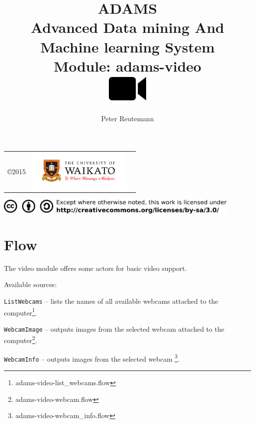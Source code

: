 \documentclass[a4paper]{book}
\title{
  \textbf{ADAMS} \\
  {\Large \textbf{A}dvanced \textbf{D}ata mining \textbf{A}nd \textbf{M}achine
  learning \textbf{S}ystem} \\
  {\Large Module: adams-video} \\
  \vspace{1cm}
  \includegraphics[width=2cm]{images/video-module.png} \\
}
\author{
  Peter Reutemann
}
\begin{document}
\begin{titlepage}
\maketitle

\thispagestyle{empty}
\center
\begin{table}[b]
	\begin{tabular}{c l l}
		\parbox[c][2cm]{2cm}{\copyright 2015} &
		\parbox[c][2cm]{5cm}{\includegraphics[width=5cm]{images/coat_of_arms.pdf}} \\
	\end{tabular}
	\includegraphics[width=12cm]{images/cc.png} \\
\end{table}

\end{titlepage}

\tableofcontents

\chapter{Flow}
The video module offers some actors for basic video support.

\noindent Available sources:
\begin{tight_itemize}
    \item \texttt{ListWebcams} -- lists the names of all available webcams
    attached to the computer\footnote{adams-video-list\_webcams.flow}.
    \item \texttt{WebcamImage} -- outputs images from the selected webcam
    attached to the computer\footnote{adams-video-webcam.flow}.
    \item \texttt{WebcamInfo} -- outputs images from the selected webcam
    \footnote{adams-video-webcam\_info.flow}.
\end{tight_itemize}
\end{document}
